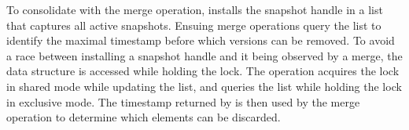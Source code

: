 To consolidate with the merge operation,  installs the snapshot
handle in a  list  that captures all active snapshots.
Ensuing merge operations query the list to identify the maximal
timestamp before which versions can be removed. To avoid a race between installing a snapshot
handle and it being observed by a merge, the data structure is accessed while
holding the lock. The  operation acquires the lock in
shared mode while updating the list, and  queries the list while holding the
lock in exclusive mode. The timestamp returned by
 is then used by the merge operation to determine which
elements can be discarded. 


